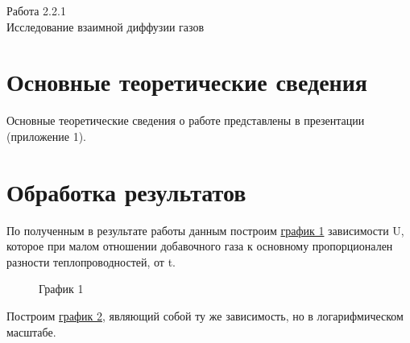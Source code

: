 \documentclass[a4paper]{article}
\begin{document}
 
\begin{center}
{Работа 2.2.1}\\
\large{Исследование взаимной диффузии газов}\\ 
\end{center} 

\section{Основные теоретические сведения}
Основные теоретические сведения о работе представлены в презентации (приложение 1).

\section{Обработка результатов}
По полученным в результате работы данным построим \hyperref[gr1]{график 1} зависимости U, которое при малом отношении добавочного газа к основному пропорционален разности теплопроводностей, от t.

\begin{figure}[h!]
\caption*{График 1}
\label{gr1}
\end{figure}

\clearpage
Построим \hyperref[gr2]{график 2}, являющий собой ту же зависимость, но в логарифмическом масштабе.
\end{document}
